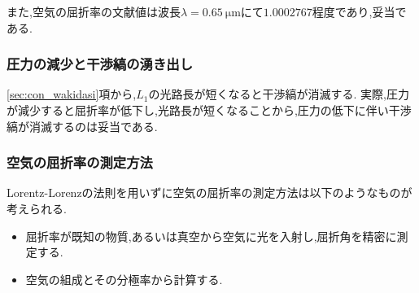 また,空気の屈折率の文献値は波長$\lambda=0.65~\si{\micro\metre}$にて$1.0002767$程度であり\cite{rika},妥当である.
\subsubsection{圧力の減少と干渉縞の湧き出し}
\ref{sec:con_wakidasi}項から,$L_1$の光路長が短くなると干渉縞が消滅する.
実際,圧力が減少すると屈折率が低下し,光路長が短くなることから,圧力の低下に伴い干渉縞が消滅するのは妥当である.
\subsubsection{空気の屈折率の測定方法}
Lorentz-Lorenzの法則を用いずに空気の屈折率の測定方法は以下のようなものが考えられる.
\begin{itemize}
  \item 屈折率が既知の物質,あるいは真空から空気に光を入射し,屈折角を精密に測定する.
  \item 空気の組成とその分極率から計算する.
\end{itemize}
